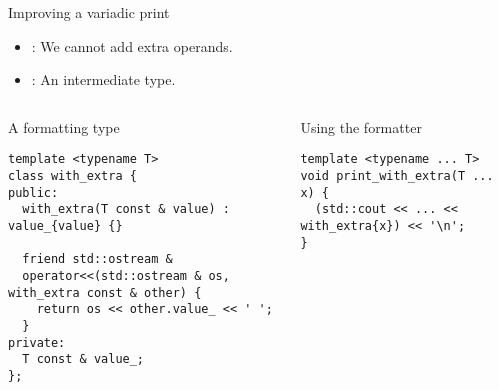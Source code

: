 \begin{frame}[t,fragile]{Improving a variadic print}
\begin{itemize}
  \item {}: We cannot add extra operands.
  \item {}: An intermediate type.
\end{itemize}

\pause
\begin{columns}[T]

\begin{block}{A formatting type}
\begin{lstlisting}
template <typename T>
class with_extra {
public:
  with_extra(T const & value) : value_{value} {}

  friend std::ostream & 
  operator<<(std::ostream & os, with_extra const & other) {
    return os << other.value_ << ' ';
  }
private:
  T const & value_;
};
\end{lstlisting}
\end{block}

\pause
{}
\begin{block}{Using the formatter}
\begin{lstlisting}
template <typename ... T>
void print_with_extra(T ... x) {
  (std::cout << ... << with_extra{x}) << '\n';
}
\end{lstlisting}
\end{block}

\end{columns}

\end{frame}
